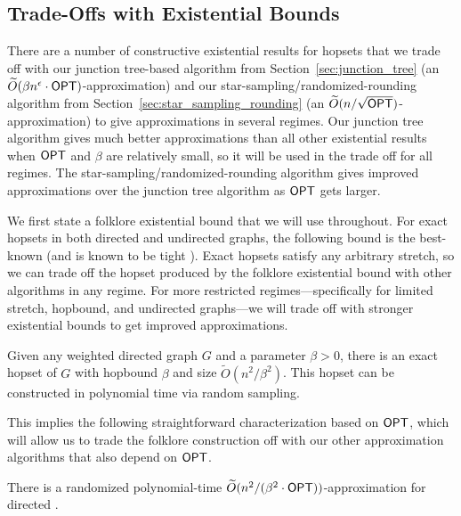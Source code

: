 
\subsection{Trade-Offs with Existential Bounds}\label{sec:existential}

There are a number of constructive existential results for hopsets that we trade off with our junction tree-based algorithm from Section~\ref{sec:junction_tree} (an $\widetilde{O}(\beta n^\epsilon \cdot {{\sf OPT}})$-approximation) and our star-sampling/randomized-rounding algorithm from Section~\ref{sec:star_sampling_rounding} (an $\widetilde{O}(n / \sqrt{{\sf OPT}})$-approximation) to give approximations in several regimes. 
Our junction tree algorithm gives much better approximations than all other existential results when ${\sf OPT}$ and $\beta$ are relatively small, so it will be used in the trade off for all regimes. The star-sampling/randomized-rounding algorithm gives improved approximations over the junction tree algorithm as ${{\sf OPT}}$ gets larger. 

\iflong  
We first state a folklore existential bound that we will use throughout. For exact hopsets in both directed and undirected graphs, the following bound is the best-known (and is known to be tight \cite{BH23folklore}). Exact hopsets satisfy any arbitrary stretch, so we can trade off the hopset produced by the folklore existential bound with other algorithms in any regime. For more restricted regimes---specifically for limited stretch, hopbound, and undirected graphs---we will trade off with stronger existential bounds to get improved approximations.

\begin{lemma}
    Given any weighted directed graph $G$ and a parameter $\beta >0$, there is an exact hopset of $G$ with hopbound $\beta$ and size $\widetilde{O}(n^2/\beta^2)$. This hopset can be constructed in polynomial time via random sampling.
\end{lemma}

This implies the following straightforward characterization based on ${\sf OPT}$, which will allow us to trade the folklore construction off with our other approximation algorithms that also depend on ${\sf OPT}$.

\begin{corollary} \label{cor:existential_folklore}
    There is a randomized polynomial-time $\widetilde{O}(n^2/ (\beta^2 \cdot {\sf OPT}))$-approximation for directed {\hopset}.
\end{corollary}

